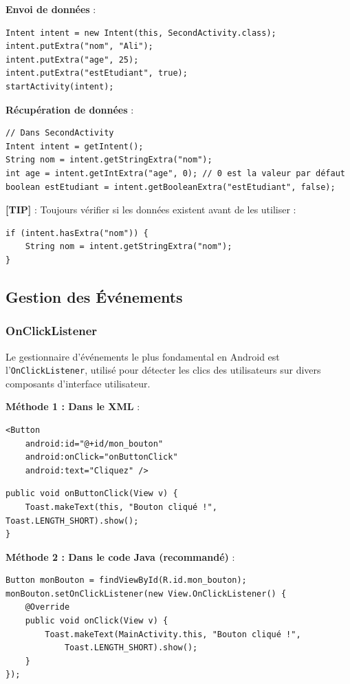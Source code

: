 \documentclass[11pt,a4paper]{article}
\begin{document}
\textbf{Envoi de données} :
\begin{lstlisting}
Intent intent = new Intent(this, SecondActivity.class);
intent.putExtra("nom", "Ali");
intent.putExtra("age", 25);
intent.putExtra("estEtudiant", true);
startActivity(intent);
\end{lstlisting}

\textbf{Récupération de données} :
\begin{lstlisting}
// Dans SecondActivity
Intent intent = getIntent();
String nom = intent.getStringExtra("nom");
int age = intent.getIntExtra("age", 0); // 0 est la valeur par défaut
boolean estEtudiant = intent.getBooleanExtra("estEtudiant", false);
\end{lstlisting}

\textbf{[TIP]} : Toujours vérifier si les données existent avant de les utiliser :
\begin{lstlisting}
if (intent.hasExtra("nom")) {
    String nom = intent.getStringExtra("nom");
}
\end{lstlisting}

\subsection{Gestion des Événements}

\subsubsection{OnClickListener}

Le gestionnaire d'événements le plus fondamental en Android est l'\texttt{OnClickListener}, utilisé pour détecter les clics des utilisateurs sur divers composants d'interface utilisateur.

\textbf{Méthode 1 : Dans le XML} :
\begin{lstlisting}[style=XML]
<Button
    android:id="@+id/mon_bouton"
    android:onClick="onButtonClick"
    android:text="Cliquez" />
\end{lstlisting}

\begin{lstlisting}
public void onButtonClick(View v) {
    Toast.makeText(this, "Bouton cliqué !", Toast.LENGTH_SHORT).show();
}
\end{lstlisting}

\textbf{Méthode 2 : Dans le code Java (recommandé)} :
\begin{lstlisting}
Button monBouton = findViewById(R.id.mon_bouton);
monBouton.setOnClickListener(new View.OnClickListener() {
    @Override
    public void onClick(View v) {
        Toast.makeText(MainActivity.this, "Bouton cliqué !", 
            Toast.LENGTH_SHORT).show();
    }
});
\end{lstlisting}
\end{document}
